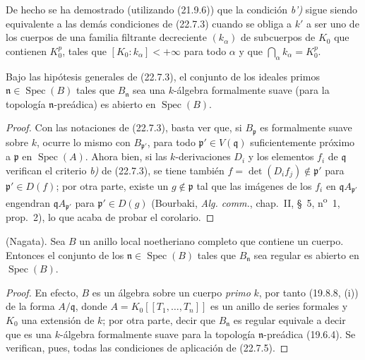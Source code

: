 
\begin{remark}[22.7.4]
\label{0.22.7.4-fr}
De hecho se ha demostrado (utilizando (21.9.6)) que la condición \emph{b')} sigue siendo
equivalente a las demás condiciones de (22.7.3) cuando se obliga a $k'$ a
ser uno de los cuerpos de una familia filtrante decreciente $(k_\alpha)$ de
subcuerpos de $K_0$ que contienen $K_0^p$, tales que
$[K_0:k_\alpha]<+\infty$ para todo $\alpha$ y que
$\bigcap_\alpha k_\alpha=K_0^p$.
\end{remark}

\begin{corollary}[22.7.5]
\label{0.22.7.5-fr}
Bajo las hipótesis generales de \textup{(22.7.3)}, el conjunto de los ideales primos
$\mathfrak n\in\operatorname{Spec}(B)$ tales que $B_{\mathfrak n}$ sea una
$k$-álgebra formalmente suave (para la topología $\mathfrak n$-preádica)
es abierto en $\operatorname{Spec}(B)$.
\end{corollary}

\begin{proof}
Con las notaciones de (22.7.3), basta ver que, si $B_{\mathfrak p}$
es formalmente suave sobre $k$, ocurre lo mismo con $B_{\mathfrak p'}$, para
todo $\mathfrak p'\in V(\mathfrak q)$ suficientemente próximo a $\mathfrak p$ en
$\operatorname{Spec}(A)$. Ahora bien, si las $k$-derivaciones $D_i$ y los elementos
$f_i$ de $\mathfrak q$ verifican el criterio \emph{b)} de (22.7.3), se tiene también
$f=\det(D_if_j)\notin\mathfrak p'$ para $\mathfrak p'\in D(f)$; por otra
parte, existe un $g\notin\mathfrak p$ tal que las imágenes de los $f_i$ en
$\mathfrak qA_{\mathfrak p'}$ engendran $\mathfrak qA_{\mathfrak p'}$ para
$\mathfrak p'\in D(g)$ (Bourbaki, \emph{Alg. comm.}, chap.~II, §~5,
n\textsuperscript{o}~1, prop.~2), lo que acaba de probar el corolario.
\end{proof}

\begin{corollary}[22.7.6]
\label{0.22.7.6-fr}
\textnormal{(Nagata).} Sea $B$ un anillo local noetheriano completo que contiene
un cuerpo. Entonces el conjunto de los $\mathfrak n\in\operatorname{Spec}(B)$ tales
que $B_{\mathfrak n}$ sea regular es abierto en $\operatorname{Spec}(B)$.
\end{corollary}

\begin{proof}
En efecto, $B$ es un álgebra sobre un cuerpo \emph{primo} $k$, por tanto (19.8.8, (i))
de la forma $A/\mathfrak q$, donde
$A=K_0[[T_1,\ldots,T_n]]$ es un anillo de series formales y $K_0$ una
extensión de $k$; por otra parte, decir que $B_{\mathfrak n}$ es regular
equivale a decir que es una $k$-álgebra formalmente suave para la topología
$\mathfrak n$-preádica (19.6.4). Se verifican, pues, todas las condiciones de aplicación de
(22.7.5).
\end{proof}

